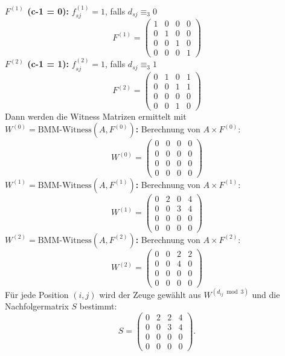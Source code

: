 \documentclass{scrartcl}
\numberwithin{equation}{section}
\begin{document}
\textbf{$F^{(1)}$ (c-1 = 0):} $f_{sj}^{(1)} = 1$, falls $d_{sj} \equiv_3 0$
$$F^{(1)} = \begin{pmatrix}
	1 & 0 & 0 & 0 \\
	0 & 1 & 0 & 0 \\
	0 & 0 & 1 & 0 \\
	0 & 0 & 0 & 1
\end{pmatrix}$$
\textbf{$F^{(2)}$ (c-1 = 1):} $f_{sj}^{(2)} = 1$, falls $d_{sj} \equiv_3 1$
$$F^{(2)} = \begin{pmatrix}
	0 & 1 & 0 & 1 \\
	0 & 0 & 1 & 1 \\
	0 & 0 & 0 & 0 \\
	0 & 0 & 1 & 0
\end{pmatrix}$$
Dann werden die Witness Matrizen ermittelt mit \\
\textbf{$W^{(0)} = \text{BMM-Witness}(A, F^{(0)})$:}
Berechnung von $A \times F^{(0)}$:
$$W^{(0)} = \begin{pmatrix}
	0 & 0 & 0 & 0 \\
	0 & 0 & 0 & 0 \\
	0 & 0 & 0 & 0 \\
	0 & 0 & 0 & 0
\end{pmatrix}$$
\textbf{$W^{(1)} = \text{BMM-Witness}(A, F^{(1)})$:}
Berechnung von $A \times F^{(1)}$:
$$W^{(1)} = \begin{pmatrix}
	0 & 2 & 0 & 4 \\
	0 & 0 & 3 & 4 \\
	0 & 0 & 0 & 0 \\
	0 & 0 & 0 & 0
\end{pmatrix}$$
\textbf{$W^{(2)} = \text{BMM-Witness}(A, F^{(2)})$:}
Berechnung von $A \times F^{(2)}$:
$$W^{(2)} = \begin{pmatrix}
	0 & 0 & 2 & 2 \\
	0 & 0 & 4 & 0 \\
	0 & 0 & 0 & 0 \\
	0 & 0 & 0 & 0
\end{pmatrix}$$
Für jede Position $(i,j)$ wird der Zeuge gewählt aus $W^{(d_{ij} \bmod 3)}$ und die Nachfolgermatrix $S$ bestimmt:
$$S = \begin{pmatrix}
	0 & 2 & 2 & 4 \\
	0 & 0 & 3 & 4 \\
	0 & 0 & 0 & 0 \\
	0 & 0 & 0 & 0
\end{pmatrix}.$$
\end{document}
